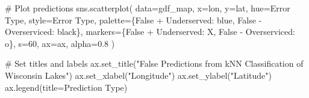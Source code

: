 \documentclass[
]{article}
\newenvironment{Shaded}{\begin{snugshade}}{\end{snugshade}}
\newcommand{\CommentTok}[1]{\textcolor[rgb]{0.37,0.37,0.37}{#1}}
\newcommand{\DecValTok}[1]{\textcolor[rgb]{0.68,0.00,0.00}{#1}}
\newcommand{\FloatTok}[1]{\textcolor[rgb]{0.68,0.00,0.00}{#1}}
\newcommand{\NormalTok}[1]{\textcolor[rgb]{0.00,0.23,0.31}{#1}}
\newcommand{\OperatorTok}[1]{\textcolor[rgb]{0.37,0.37,0.37}{#1}}
\newcommand{\StringTok}[1]{\textcolor[rgb]{0.13,0.47,0.30}{#1}}
\begin{document}
\begin{Shaded}
\begin{Highlighting}[]
\CommentTok{\# Plot predictions}
\NormalTok{sns.scatterplot(}
\NormalTok{    data}\OperatorTok{=}\NormalTok{gdf\_map,}
\NormalTok{    x}\OperatorTok{=}\StringTok{\textquotesingle{}lon\textquotesingle{}}\NormalTok{, y}\OperatorTok{=}\StringTok{\textquotesingle{}lat\textquotesingle{}}\NormalTok{,}
\NormalTok{    hue}\OperatorTok{=}\StringTok{\textquotesingle{}Error Type\textquotesingle{}}\NormalTok{, style}\OperatorTok{=}\StringTok{\textquotesingle{}Error Type\textquotesingle{}}\NormalTok{,}
\NormalTok{    palette}\OperatorTok{=}\NormalTok{\{}\StringTok{\textquotesingle{}False + Underserved\textquotesingle{}}\NormalTok{: }\StringTok{\textquotesingle{}blue\textquotesingle{}}\NormalTok{, }\StringTok{\textquotesingle{}False {-} Overserviced\textquotesingle{}}\NormalTok{: }\StringTok{\textquotesingle{}black\textquotesingle{}}\NormalTok{\},}
\NormalTok{    markers}\OperatorTok{=}\NormalTok{\{}\StringTok{\textquotesingle{}False + Underserved\textquotesingle{}}\NormalTok{: }\StringTok{\textquotesingle{}X\textquotesingle{}}\NormalTok{, }\StringTok{\textquotesingle{}False {-} Overserviced\textquotesingle{}}\NormalTok{: }\StringTok{\textquotesingle{}o\textquotesingle{}}\NormalTok{\},}
\NormalTok{    s}\OperatorTok{=}\DecValTok{60}\NormalTok{, ax}\OperatorTok{=}\NormalTok{ax, alpha}\OperatorTok{=}\FloatTok{0.8}
\NormalTok{)}

\CommentTok{\# Set titles and labels}
\NormalTok{ax.set\_title(}\StringTok{"False Predictions from kNN Classification of Wisconsin Lakes"}\NormalTok{)}
\NormalTok{ax.set\_xlabel(}\StringTok{"Longitude"}\NormalTok{)}
\NormalTok{ax.set\_ylabel(}\StringTok{"Latitude"}\NormalTok{)}
\NormalTok{ax.legend(title}\OperatorTok{=}\StringTok{\textquotesingle{}Prediction Type\textquotesingle{}}\NormalTok{)}
\end{Highlighting}
\end{Shaded}
\end{document}
